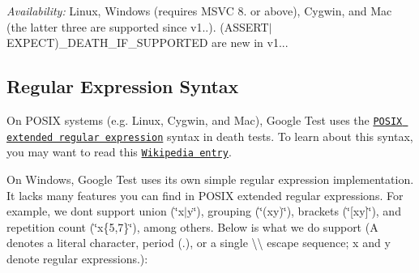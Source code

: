 {\itshape Availability\+:} Linux, Windows (requires M\+S\+VC 8. or above), Cygwin, and Mac (the latter three are supported since v1..). {\ttfamily (A\+S\+S\+E\+R\+T$\vert$\+E\+X\+P\+E\+CT)\+\_\+\+D\+E\+A\+T\+H\+\_\+\+I\+F\+\_\+\+S\+U\+P\+P\+O\+R\+T\+ED} are new in v1...

\subsection*{Regular Expression Syntax}

On P\+O\+S\+IX systems (e.\+g. Linux, Cygwin, and Mac), Google Test uses the \href{http://www.opengroup.org/onlinepubs/009695399/basedefs/xbd_chap09.html#tag_09_04}{\tt P\+O\+S\+IX extended regular expression} syntax in death tests. To learn about this syntax, you may want to read this \href{http://en.wikipedia.org/wiki/Regular_expression#POSIX_Extended_Regular_Expressions}{\tt Wikipedia entry}.

On Windows, Google Test uses its own simple regular expression implementation. It lacks many features you can find in P\+O\+S\+IX extended regular expressions. For example, we don\textquotesingle{}t support union ({\ttfamily \char`\"{}x$\vert$y\char`\"{}}), grouping ({\ttfamily \char`\"{}(xy)\char`\"{}}), brackets ({\ttfamily \char`\"{}\mbox{[}xy\mbox{]}\char`\"{}}), and repetition count ({\ttfamily \char`\"{}x\{5,7\}\char`\"{}}), among others. Below is what we do support ({\ttfamily A} denotes a literal character, period ({\ttfamily .}), or a single {\ttfamily \textbackslash{}\textbackslash{}} escape sequence; {\ttfamily x} and {\ttfamily y} denote regular expressions.)\+:

